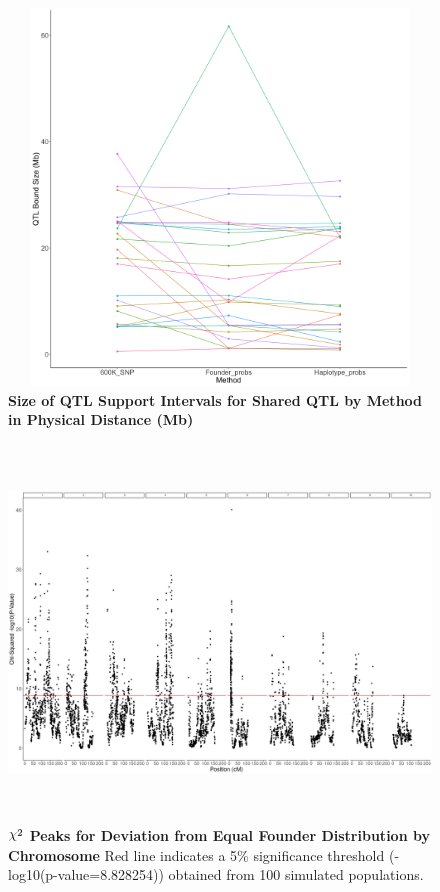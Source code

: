 \documentclass[article,9pt,twocolumn,twoside]{rilabRxiv}
\DeclareRobustCommand{\rchi}{{\mathpalette\irchi\relax}}
\newcommand{\irchi}[2]{\raisebox{\depth}{$#1\chi$}} %
\begin{document}
\begin{figure}[ht]
\centering
\includegraphics[width=16cm,height=10cm]{figures/support_interval_Mb.png}
\caption{\textbf{Size of QTL Support Intervals for Shared QTL by Method in Physical Distance (Mb)}}
\label{fig:supfigure16}
\end{figure}

\begin{figure}[ht]
\centering
\includegraphics[width=16cm,height=10cm]{figures/all_chrom_founder_chi_sq.png}
\caption{\textbf{$\rchi^2$ Peaks for Deviation from Equal Founder Distribution by Chromosome} Red line indicates a 5\% significance threshold (-log10(p-value=8.828254)) obtained from 100 simulated populations.}
\label{fig:supfigure11}
\end{figure}
\end{document}
